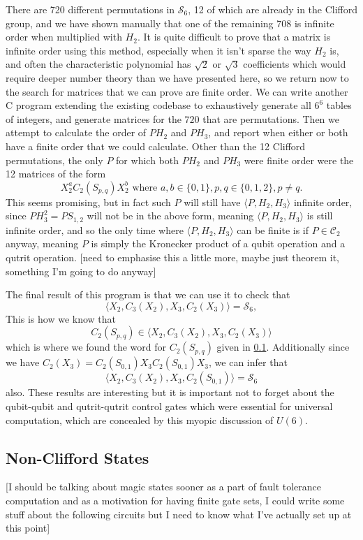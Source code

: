 There are 720 different permutations in $\mathcal{S}_6$, 12 of which are already in the Clifford group, and we have shown manually that one of the remaining 708 is infinite order when multiplied with $H_2$. It is quite difficult to prove that a matrix is infinite order using this method, especially when it isn't sparse the way $H_2$ is, and often the characteristic polynomial has $\sqrt{2}$ or $\sqrt{3}$ coefficients which would require deeper number theory than we have presented here, so we return now to the search for matrices that we can prove are finite order. We can write another C program extending the existing codebase to exhaustively generate all $6^6$ tables of integers, and generate matrices for the $720$ that are permutations. Then we attempt to calculate the order of $P H_2$ and $P H_3$, and report when either or both have a finite order that we could calculate. Other than the 12 Clifford permutations, the only $P$ for which both $P H_2$ and $P H_3$ were finite order were the 12 matrices of the form
\[X_2^a C_2(S_{p,q}) X_2^b\text{\ where\ }a, b \in \{0, 1\}, p, q \in \{0, 1, 2\}, p \neq q.\]
This seems promising, but in fact such $P$ will still have $\langle P, H_2, H_3\rangle$ infinite order, since $P H_3^2 = P S_{1,2}$ will not be in the above form, meaning $\langle P, H_2, H_3 \rangle$ is still infinite order, and so the only time where $\langle P, H_2, H_3 \rangle$ can be finite is if $P \in \mathcal{C}_2$ anyway, meaning $P$ is simply the Kronecker product of a qubit operation and a qutrit operation. [need to emphasise this a little more, maybe just theorem it, something I'm going to do anyway]

The final result of this program is that we can use it to check that
\[\langle X_2, C_3(X_2), X_3, C_2(X_3) \rangle = \mathcal{S}_6,\]
This is how we know that
\[C_2(S_{p,q}) \in \langle X_2, C_3(X_2), X_3, C_2(X_3) \rangle\]
which is where we found the word for $C_2(S_{p,q})$ given in \ref{}. Additionally since we have $C_2(X_3) = C_2(S_{0,1})X_3C_2(S_{0,1})X_3$, we can infer that
\[\langle X_2, C_3(X_2), X_3, C_2(S_{0,1})\rangle = \mathcal{S}_6\]
also. These results are interesting but it is important not to forget about the qubit-qubit and qutrit-qutrit control gates which were essential for universal computation, which are concealed by this myopic discussion of $U(6)$.

\subsection{Non-Clifford States}
[I should be talking about magic states sooner as a part of fault tolerance computation and as a motivation for having finite gate sets, I could write some stuff about the following circuits but I need to know what I've actually set up at this point]

